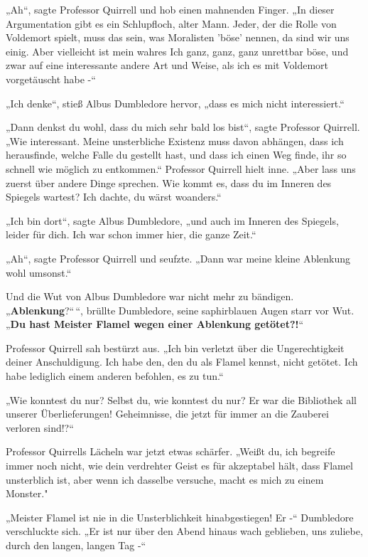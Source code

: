 {„Ah“, sagte Professor Quirrell und hob einen mahnenden Finger. „In dieser Argumentation gibt es ein Schlupfloch, alter Mann. Jeder, der die Rolle von Voldemort spielt, muss das sein, was Moralisten 'böse' nennen, da sind wir uns einig. Aber vielleicht ist mein wahres Ich ganz, ganz, ganz unrettbar böse, und zwar auf eine interessante andere Art und Weise, als ich es mit Voldemort vorgetäuscht habe -“

„Ich denke“, stieß Albus Dumbledore hervor, „dass es mich nicht interessiert.“

„Dann denkst du wohl, dass du mich sehr bald los bist“, sagte Professor Quirrell. „Wie interessant. Meine unsterbliche Existenz muss davon abhängen, dass ich herausfinde, welche Falle du gestellt hast, und dass ich einen Weg finde, ihr so schnell wie möglich zu entkommen.“ Professor Quirrell hielt inne. „Aber lass uns zuerst über andere Dinge sprechen. Wie kommt es, dass du im Inneren des Spiegels wartest? Ich dachte, du wärst woanders.“

„Ich bin dort“, sagte Albus Dumbledore, „und auch im Inneren des Spiegels, leider für dich. Ich war schon immer hier, die ganze Zeit.“

„Ah“, sagte Professor Quirrell und seufzte. „Dann war meine kleine Ablenkung wohl umsonst.“

Und die Wut von Albus Dumbledore war nicht mehr zu bändigen.\\ „\textbf{Ablenkung}?“\,“, brüllte Dumbledore, seine saphirblauen Augen starr vor Wut. „\textbf{Du hast Meister Flamel wegen einer Ablenkung getötet?!}“

Professor Quirrell sah bestürzt aus. „Ich bin verletzt über die Ungerechtigkeit deiner Anschuldigung. Ich habe den, den du als Flamel kennst, nicht getötet. Ich habe lediglich einem anderen befohlen, es zu tun.“

„Wie konntest du nur? Selbst du, wie konntest du nur? Er war die Bibliothek all unserer Überlieferungen! Geheimnisse, die jetzt für immer an die Zauberei verloren sind!?“

Professor Quirrells Lächeln war jetzt etwas schärfer. „Weißt du, ich begreife immer noch nicht, wie dein verdrehter Geist es für akzeptabel hält, dass Flamel unsterblich ist, aber wenn ich dasselbe versuche, macht es mich zu einem Monster."

„Meister Flamel ist nie in die Unsterblichkeit hinabgestiegen! Er -“ Dumbledore verschluckte sich. „Er ist nur über den Abend hinaus wach geblieben, uns zuliebe, durch den langen, langen Tag -“

}
